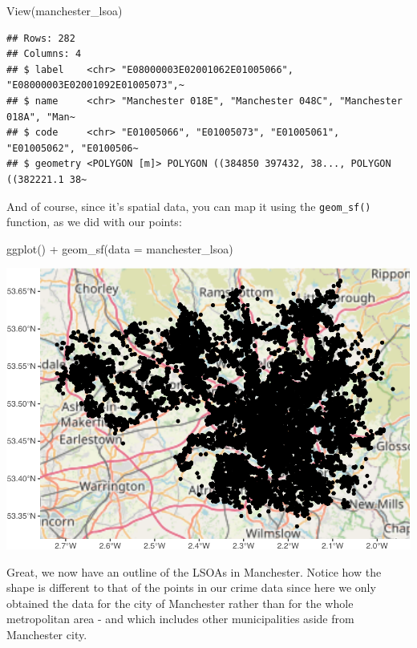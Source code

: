\documentclass[
]{book}
\newenvironment{Shaded}{\begin{snugshade}}{\end{snugshade}}
\newcommand{\AttributeTok}[1]{\textcolor[rgb]{0.77,0.63,0.00}{#1}}
\newcommand{\FunctionTok}[1]{\textcolor[rgb]{0.00,0.00,0.00}{#1}}
\newcommand{\NormalTok}[1]{#1}
\newcommand{\SpecialCharTok}[1]{\textcolor[rgb]{0.00,0.00,0.00}{#1}}
\begin{document}
\begin{Shaded}
\begin{Highlighting}[]
\FunctionTok{View}\NormalTok{(manchester\_lsoa)}
\end{Highlighting}
\end{Shaded}

\begin{verbatim}
## Rows: 282
## Columns: 4
## $ label    <chr> "E08000003E02001062E01005066", "E08000003E02001092E01005073",~
## $ name     <chr> "Manchester 018E", "Manchester 048C", "Manchester 018A", "Man~
## $ code     <chr> "E01005066", "E01005073", "E01005061", "E01005062", "E0100506~
## $ geometry <POLYGON [m]> POLYGON ((384850 397432, 38..., POLYGON ((382221.1 38~
\end{verbatim}

And of course, since it's spatial data, you can map it using the \texttt{geom\_sf()} function, as we did with our points:

\begin{Shaded}
\begin{Highlighting}[]
\FunctionTok{ggplot}\NormalTok{() }\SpecialCharTok{+} 
  \FunctionTok{geom\_sf}\NormalTok{(}\AttributeTok{data =}\NormalTok{ manchester\_lsoa)}
\end{Highlighting}
\end{Shaded}

\includegraphics{crime_mapping_files/figure-latex/unnamed-chunk-15-1.pdf}

Great, we now have an outline of the LSOAs in Manchester. Notice how the shape is different to that of the points in our crime data since here we only obtained the data for the city of Manchester rather than for the whole metropolitan area - and which includes other municipalities aside from Manchester city.
\end{document}
